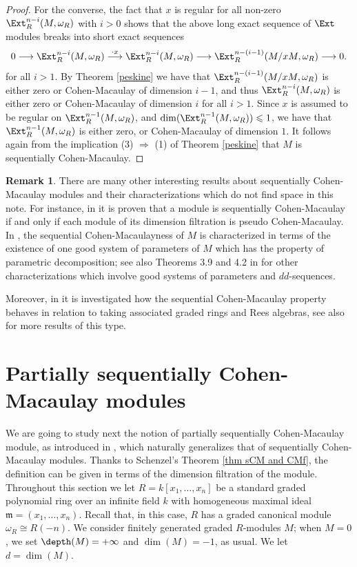 \documentclass[12pt]{amsart}
\theoremstyle{definition}
\theoremstyle{definition}
\newtheorem{remark}[theorem]{Remark}
\def\frk{\mathfrak}               %
\def\mm{{\frk m}}
\renewcommand{\leq}{\leqslant}
\let\lra\longrightarrow
\begin{document}
\begin{proof}
For the converse, the fact that $x$ is regular for all non-zero $\Ext^{n-i}_R(M,\omega_R)$ with $i>0$ shows that the above long exact sequence of $\Ext$ modules breaks into short exact sequences 
\[
0 \lra \Ext^{n-i}_R(M,\omega_R) \stackrel{\cdot x}{\lra} \Ext^{n-i}_R(M,\omega_R) \lra \Ext^{n-(i-1)}_R(M/xM,\omega_R) \lra 0.
\]
for all $i>1$. By Theorem \ref{peskine} we have that $\Ext^{n-(i-1)}_R(M/xM,\omega_R)$ is either zero or Cohen-Macaulay of dimension $i-1$, and thus $\Ext^{n-i}_R(M,\omega_R)$ is either zero or Cohen-Macaulay of dimension $i$ for all $i>1$. Since $x$ is assumed to be regular on $\Ext^{n-1}_R(M,\omega_R)$, and $\dim(\Ext^{n-1}_R(M,\omega_R)) \leq 1$, we have that $\Ext^{n-1}_R(M,\omega_R)$ is either zero, or Cohen-Macaulay of dimension $1$. It follows  again from the implication (3) $\Rightarrow$ (1) of Theorem \ref{peskine} that $M$ is sequentially Cohen-Macaulay.
\end{proof}

\begin{remark}\label{parsys}
  There are many other interesting results about  sequentially Cohen-Macaulay modules and their characterizations which do not find space in this note. For instance, 
  in \cite[Theorem 5.1]{CC07} it is proven that a module is sequentially Cohen-Macaulay if and only if each module of its dimension filtration is pseudo Cohen-Macaulay. In \cite[Theorem 1.1]{CL09}, the sequential Cohen-Macaulayness of $M$ is characterized in terms of the existence of one good system of parameters of $M$ which has the property of parametric decomposition; see also Theorems 3.9 and 4.2 in \cite{CC07} for other characterizations which involve good systems of parameters and $dd$-sequences.

Moreover, in \cite{CGT13} it is investigated how the sequential Cohen-Macaulay property behaves in relation to taking associated graded rings and Rees algebras, see also  \cite{TPDA17} for more results of this type.
\end{remark}

   

\section{Partially sequentially Cohen-Macaulay modules}
We are going to study next the notion of partially sequentially Cohen-Macaulay module, as introduced in \cite{SS17}, which naturally generalizes that of sequentially Cohen-Macaulay modules. Thanks to Schenzel's Theorem \ref{thm sCM and CMf}, the definition can be given in terms of the dimension filtration of the module. Throughout this section we let $R=k[x_1,\dots, x_n]$ be a standard graded polynomial ring over an infinite field $k$ with homogeneous maximal ideal $\mm=(x_1, \dots, x_n)$. Recall that, in this case, $R$ has a graded canonical module $\omega_R \cong R(-n)$. We consider finitely generated graded $R$-modules $M$; when $M=0$, we set $\depth(M)=+\infty$ and $\dim(M)=-1$, as usual.  We let $d=\dim(M)$.
\end{document}
